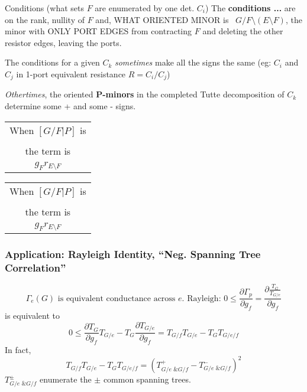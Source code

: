\documentclass{beamer}
\newcommand{\Remph}[1]{{\color{red}#1}}
\begin{document}
\begin{frame}{Conditions (what sets $F$ are enumerated by one det. $C_i$)
}
The \textbf{conditions ...}
are on the rank, nullity of $F$ and, WHAT ORIENTED MINOR is \
$G/F\setminus (E\setminus F)$, the minor
with ONLY PORT EDGES from contracting $F$
and deleting the other resistor edges, leaving the
ports.

The conditions for a given $C_k$ \textit{sometimes}
make all the signs the same (eg: $C_i$ and 
$C_j$ in 1-port equivalent resistance $R=C_i/C_j$)

\textit{Othertimes}, the oriented \textbf{P-minors}
in the completed Tutte decomposition of $C_k$ determine
some + and some - signs.

\begin{center}
\begin{minipage}{0.3\textwidth}
\begin{tabular}{c}
When $[G/F|P]$ is \\
 \\
the term is \\
\Remph{{\LARGE\bf +}}$g_Fr_{E\setminus F}$ \\
\end{tabular}
\end{minipage}
\begin{minipage}{0.3\textwidth}
\begin{tabular}{c}
When $[G/F|P]$ is\\
\\
the term is\\
\Remph{{\LARGE\bf -}}$g_Fr_{E\setminus F}$\\
\end{tabular}
\end{minipage}
\end{center}

\end{frame}

\begin{frame}
\frametitle{Application: Rayleigh Identity, ``Neg. Spanning Tree Correlation''}
\[
\Gamma_e(G)\text{ is equivalent conductance across }e.
\text{ Rayleigh: }0 \le \frac{\partial \Gamma_{p}}{\partial g_f} =
\frac{\partial \frac{T_G}{T_{G/e}}}{\partial g_f}
\]
is equivalent to 
\[
0 \le \frac{\partial T_G}{\partial g_f}T_{G/e} - 
       T_G\frac{\partial T_{G/e}}{\partial g_f} 
=
T_{G/f}T_{G/e} - T_GT_{G/e/f}
\]
In fact,
\[
T_{G/f}T_{G/e} - T_GT_{G/e/f} = \left( T^+_{G/e \text{ \& } G/f} - T^-_{G/e \text{ \& } G/f} \right)^2
\]
$T^{\pm}_{G/e \text{ \& } G/f}$ enumerate the $\pm$ common spanning trees.
\end{frame}
\end{document}
